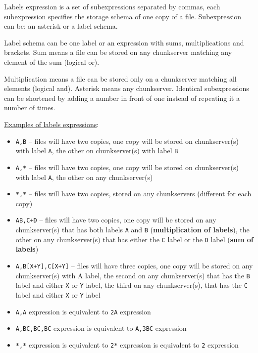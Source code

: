\documentclass[a4paper,11pt,english]{report}
\def\code#1{\texttt{#1}}
\begin{document}
					Labels expression is a set of subexpressions separated by commas, each subexpression specifies the storage schema of one copy of a file. Subexpression can be: an asterisk or a label schema.
					
					Label schema can be one label or an expression with sums, multiplications and brackets. Sum means a file can be stored on any chunkserver matching any element of the sum (logical or).
					
					Multiplication means a file can be stored only on a chunkserver matching all elements (logical and).  Asterisk means any chunkserver. Identical subexpressions can be shortened by adding a  number  in  front  of  one	instead of repeating it a number of times.
		
					\bigskip		
				
					\underline{Examples of labels expressions}:
				
					\begin{itemize}
						\item \code{A,B} -- files will have two copies, one copy will be stored on chunkserver(s) with label \code{A}, the other on chunkserver(s) with label \code{B}
				
						\item \code{A,*} -- files will have two copies, one copy will be stored on chunkserver(s) with label \code{A}, the other on any chunkserver(s)
				
						\item \code{*,*} -- files will have two copies, stored on any chunkservers (different for each copy)
					
						\item \code{AB,C+D} -- files will have two copies, one copy will be stored on any chunkserver(s) that has both labels \code{A} and \code{B} (\textbf{multiplication of labels}), the other on any chunkserver(s) that has either the \code{C} label or the \code{D} label (\textbf{sum of labels})
				
						\item \code{A,B[X+Y],C[X+Y]} -- files will have three copies, one copy will be stored on any chunkserver(s) with A label, the second on any chunkserver(s) that has the \code{B} label and either \code{X} or \code{Y} label, the third on any chunkserver(s), that has the \code{C} label and either \code{X} or \code{Y} label
				
						\item \code{A,A} expression is equivalent to \code{2A} expression
				
						\item \code{A,BC,BC,BC} expression is equivalent to \code{A,3BC} expression
				
						\item \code{*,*} expression is equivalent to \code{2*} expression is equivalent to \code{2} expression
					\end{itemize}
					
\end{document}
